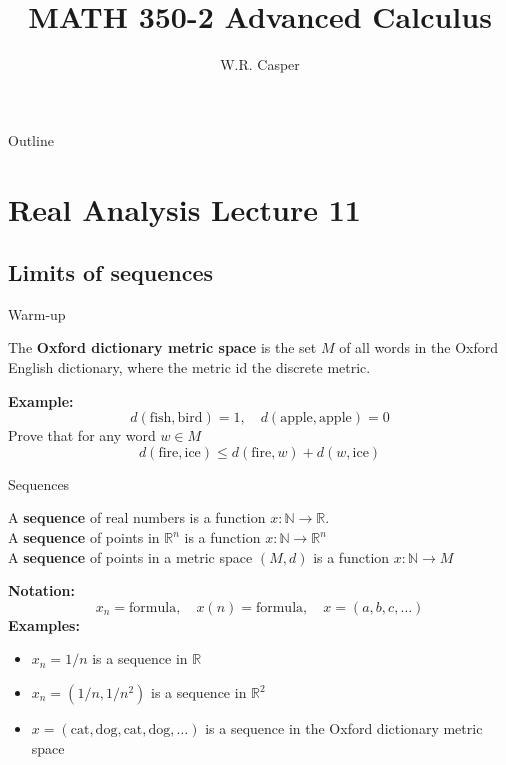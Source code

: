 \documentclass{beamer}
\title{MATH 350-2 Advanced Calculus}
\subtitle
{} %
\author[W.R. Casper] %
{W.R. Casper}
\institute[California State University Fullerton] %
{
  Department of Mathematics\\
  California State University Fullerton}
\begin{document}
\begin{frame}
  \titlepage
\end{frame}

\begin{frame}{Outline}
  \tableofcontents
\end{frame}



\section{Real Analysis Lecture 11}


\subsection{Limits of sequences}

\begin{frame}{Warm-up}
\begin{defn}
The \textbf{Oxford dictionary metric space} is the set $M$ of all words in the Oxford
English dictionary, where the metric id the discrete metric.
\end{defn}
\textbf{Example:}
$$d(\text{fish},\text{bird}) = 1,\quad d(\text{apple},\text{apple}) = 0$$
Prove that for any word $w\in M$
$$d(\text{fire},\text{ice})\leq d(\text{fire},w) + d(w,\text{ice})$$
\end{frame}

\begin{frame}{Sequences}
\begin{defn}
A \textbf{sequence} of real numbers is a function $x: \mathbb N\rightarrow\mathbb R$.\\
A \textbf{sequence} of points in $\mathbb R^n$ is a function $x: \mathbb N\rightarrow\mathbb R^n$\\
A \textbf{sequence} of points in a metric space $(M,d)$ is a function $x: \mathbb N\rightarrow M$
\end{defn}
\textbf{Notation:}
$$x_n=\text{formula},\quad x(n) = \text{formula},\quad x = (a,b,c,\dots)$$
\textbf{Examples:}
\begin{itemize}
\item $x_n = 1/n$ is a sequence in $\mathbb R$
\item $x_n = (1/n,1/n^2)$ is a sequence in $\mathbb R^2$
\item $x = (\text{cat},\text{dog},\text{cat},\text{dog},\dots)$ is a sequence in the Oxford dictionary metric space
\end{itemize}
\end{frame}
\end{document}
